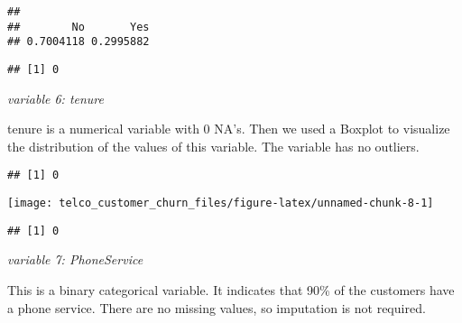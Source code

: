 \documentclass[
  a4paper]{article}
\newenvironment{Shaded}{\begin{snugshade}}{\end{snugshade}}
\newcommand{\AttributeTok}[1]{\textcolor[rgb]{0.13,0.29,0.53}{#1}}
\newcommand{\CommentTok}[1]{\textcolor[rgb]{0.56,0.35,0.01}{\textit{#1}}}
\newcommand{\ConstantTok}[1]{\textcolor[rgb]{0.56,0.35,0.01}{#1}}
\newcommand{\FunctionTok}[1]{\textcolor[rgb]{0.13,0.29,0.53}{\textbf{#1}}}
\newcommand{\NormalTok}[1]{#1}
\newcommand{\SpecialCharTok}[1]{\textcolor[rgb]{0.81,0.36,0.00}{\textbf{#1}}}
\begin{document}
\begin{verbatim}
## 
##        No       Yes 
## 0.7004118 0.2995882
\end{verbatim}

\begin{Shaded}
\end{Shaded}

\begin{verbatim}
## [1] 0
\end{verbatim}

\emph{variable 6: tenure}

tenure is a numerical variable with 0 NA's. Then we used a Boxplot to
visualize the distribution of the values of this variable. The variable
has no outliers.

\begin{Shaded}
\end{Shaded}

\begin{verbatim}
## [1] 0
\end{verbatim}

\begin{Shaded}
\end{Shaded}

\texttt{[image: telco\_customer\_churn\_files/figure-latex/unnamed-chunk-8-1]}

\begin{verbatim}
## [1] 0
\end{verbatim}

\emph{variable 7: PhoneService}

This is a binary categorical variable. It indicates that 90\% of the
customers have a phone service. There are no missing values, so
imputation is not required.
\end{document}
